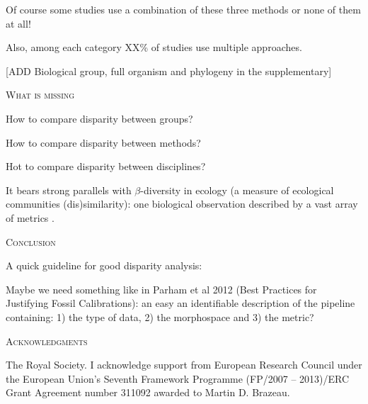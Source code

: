 \documentclass[12pt,letterpaper]{article}
\renewcommand{\section}[1]{%
\bigskip
\begin{center}
\begin{Large}
\normalfont\scshape #1
\medskip
\end{Large}
\end{center}}
\begin{document}
Of course some studies use a combination of these three methods or none of them at all!

Also, among each category XX\% of studies use multiple approaches.

[ADD Biological group, full organism and phylogeny in the supplementary]

\section{What is missing}

How to compare disparity between groups?

How to compare disparity between methods?

Hot to compare disparity between disciplines?

It bears strong parallels with $\beta$-diversity in ecology (a measure of ecological communities (dis)similarity): one biological observation described by a vast array of metrics \citep{baselga2010partitioning, anderson2011navigating, donohue2016navigating}.


\section{Conclusion}

A quick guideline for good disparity analysis:

Maybe we need something like in Parham et al 2012 (Best Practices for Justifying Fossil Calibrations): an easy an identifiable description of the pipeline containing: 1) the type of data, 2) the morphospace and 3) the metric? 

\section{Acknowledgments}
The Royal Society.
I acknowledge support from European Research Council under the European Union's Seventh Framework Programme (FP/2007 – 2013)/ERC Grant Agreement number 311092 awarded to Martin D. Brazeau.




\end{document}
